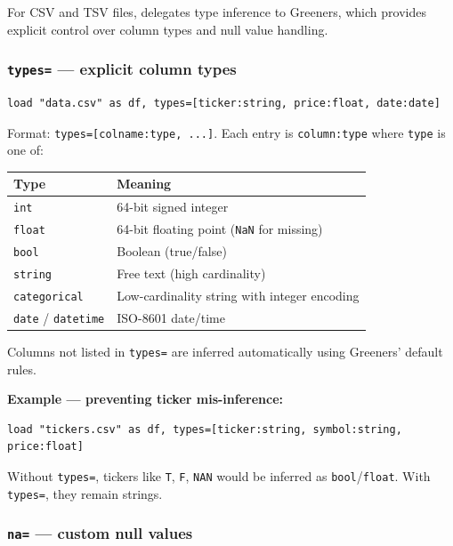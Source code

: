 For CSV and TSV files, \hayashi{} delegates type inference to Greeners, which
provides explicit control over column types and null value handling.

\subsubsection*{\texttt{types=} --- explicit column types}

\begin{lstlisting}[caption={Explicit column types}]
load "data.csv" as df, types=[ticker:string, price:float, date:date]
\end{lstlisting}

Format: \texttt{types=[colname:type, ...]}. Each entry is \texttt{column:type}
where \texttt{type} is one of:

\begin{center}
\begin{tabular}{ll}
\toprule
\textbf{Type} & \textbf{Meaning} \\
\midrule
\texttt{int}       & 64-bit signed integer \\
\texttt{float}    & 64-bit floating point (\texttt{NaN} for missing) \\
\texttt{bool}     & Boolean (true/false) \\
\texttt{string}   & Free text (high cardinality) \\
\texttt{categorical} & Low-cardinality string with integer encoding \\
\texttt{date} / \texttt{datetime} & ISO-8601 date/time \\
\bottomrule
\end{tabular}
\end{center}

Columns not listed in \texttt{types=} are inferred automatically using
Greeners' default rules.

\textbf{Example --- preventing ticker mis-inference:}

\begin{lstlisting}[caption={Forcing ticker and symbol to string}]
load "tickers.csv" as df, types=[ticker:string, symbol:string, price:float]
\end{lstlisting}

Without \texttt{types=}, tickers like \texttt{T}, \texttt{F}, \texttt{NAN} would be
inferred as \texttt{bool}/\texttt{float}. With \texttt{types=}, they remain strings.

\subsubsection*{\texttt{na=} --- custom null values}

